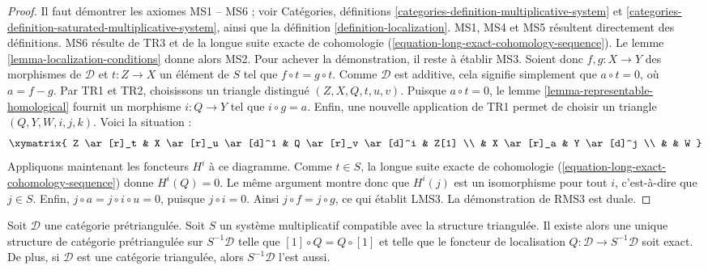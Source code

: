 \begin{proof}
Il faut démontrer les axiomes MS1 -- MS6 ; voir Catégories, définitions
\ref{categories-definition-multiplicative-system} et
\ref{categories-definition-saturated-multiplicative-system}, ainsi que la
définition \ref{definition-localization}.
MS1, MS4 et MS5 résultent directement des définitions.
MS6 résulte de TR3 et de la longue suite exacte de cohomologie
(\ref{equation-long-exact-cohomology-sequence}).
Le lemme \ref{lemma-localization-conditions} donne alors MS2. Pour achever la
démonstration, il reste à établir MS3. Soient donc $f, g : X \to Y$ des
morphismes de $\mathcal{D}$ et $t : Z \to X$ un élément de $S$ tel que
$f \circ t = g \circ t$. Comme $\mathcal{D}$ est additive, cela signifie
simplement que $a \circ t = 0$, où $a = f - g$. Par TR1 et TR2, choisissons un
triangle distingué $(Z, X, Q, t, u, v)$. Puisque $a \circ t = 0$, le
lemme \ref{lemma-representable-homological} fournit un morphisme
$i : Q \to Y$ tel que $i \circ g = a$. Enfin, une nouvelle application de TR1
permet de choisir un triangle $(Q, Y, W, i, j, k)$. Voici la situation :
$$
\xymatrix{
Z \ar[r]_t & X \ar[r]_u \ar[d]^1 & Q \ar[r]_v \ar[d]^i & Z[1] \\
& X \ar[r]_a & Y \ar[d]^j \\
& & W
}
$$
Appliquons maintenant les foncteurs $H^i$ à ce diagramme.
Comme $t \in S$, la longue suite exacte de cohomologie
(\ref{equation-long-exact-cohomology-sequence}) donne $H^i(Q) = 0$.
Le même argument montre donc que $H^i(j)$ est un isomorphisme pour tout $i$,
c'est-à-dire que $j \in S$. Enfin, $j \circ a = j \circ i \circ u = 0$,
puisque $j \circ i = 0$. Ainsi $j \circ f = j \circ g$, ce qui établit LMS3.
La démonstration de RMS3 est duale.
\end{proof}

\begin{proposition}
\label{proposition-construct-localization}
Soit $\mathcal{D}$ une catégorie prétriangulée. Soit $S$ un système
multiplicatif compatible avec la structure triangulée.
Il existe alors une unique structure de catégorie prétriangulée sur
$S^{-1}\mathcal{D}$ telle que $[1] \circ Q = Q \circ [1]$ et telle que le
foncteur de localisation $Q : \mathcal{D} \to S^{-1}\mathcal{D}$ soit exact.
De plus, si $\mathcal{D}$ est une catégorie triangulée, alors
$S^{-1}\mathcal{D}$ l'est aussi.
\end{proposition}

